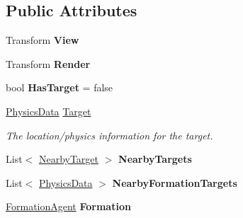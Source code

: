 \subsection*{Public Attributes}
\begin{DoxyCompactItemize}
\item 
\hypertarget{class_skyrates_1_1_a_i_1_1_behavior_1_1_data_behavioral_a1f3bf9e38a1593fdcd007132e396ab83}{Transform {\bfseries View}}\label{class_skyrates_1_1_a_i_1_1_behavior_1_1_data_behavioral_a1f3bf9e38a1593fdcd007132e396ab83}

\item 
\hypertarget{class_skyrates_1_1_a_i_1_1_behavior_1_1_data_behavioral_ac329719c8d5863865bf5f711eeb069f2}{Transform {\bfseries Render}}\label{class_skyrates_1_1_a_i_1_1_behavior_1_1_data_behavioral_ac329719c8d5863865bf5f711eeb069f2}

\item 
\hypertarget{class_skyrates_1_1_a_i_1_1_behavior_1_1_data_behavioral_adedea3cf2b21925f1e362b4d6ac011d7}{bool {\bfseries Has\-Target} = false}\label{class_skyrates_1_1_a_i_1_1_behavior_1_1_data_behavioral_adedea3cf2b21925f1e362b4d6ac011d7}

\item 
\hyperlink{class_skyrates_1_1_physics_1_1_physics_data}{Physics\-Data} \hyperlink{class_skyrates_1_1_a_i_1_1_behavior_1_1_data_behavioral_aabf18c199391e680f75cbe93fdd7d5e6}{Target}
\begin{DoxyCompactList}\small\item\em The location/physics information for the target. \end{DoxyCompactList}\item 
\hypertarget{class_skyrates_1_1_a_i_1_1_behavior_1_1_data_behavioral_a86fae9c1ce2881131d69d516344a219f}{List$<$ \hyperlink{class_skyrates_1_1_a_i_1_1_behavior_1_1_data_behavioral_1_1_nearby_target}{Nearby\-Target} $>$ {\bfseries Nearby\-Targets}}\label{class_skyrates_1_1_a_i_1_1_behavior_1_1_data_behavioral_a86fae9c1ce2881131d69d516344a219f}

\item 
\hypertarget{class_skyrates_1_1_a_i_1_1_behavior_1_1_data_behavioral_ac38016e578fb40bebf4efe695a05ff15}{List$<$ \hyperlink{class_skyrates_1_1_physics_1_1_physics_data}{Physics\-Data} $>$ {\bfseries Nearby\-Formation\-Targets}}\label{class_skyrates_1_1_a_i_1_1_behavior_1_1_data_behavioral_ac38016e578fb40bebf4efe695a05ff15}

\item 
\hypertarget{class_skyrates_1_1_a_i_1_1_behavior_1_1_data_behavioral_a2066d38a56ec4020436c8e0fbdeb8ecc}{\hyperlink{class_skyrates_1_1_a_i_1_1_formation_1_1_formation_agent}{Formation\-Agent} {\bfseries Formation}}\label{class_skyrates_1_1_a_i_1_1_behavior_1_1_data_behavioral_a2066d38a56ec4020436c8e0fbdeb8ecc}


\end{DoxyCompactItemize}
